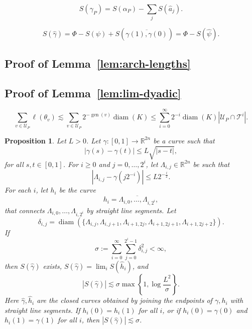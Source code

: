 \documentclass[10pt,a4paper]{amsart}
\newtheorem{prop}{Proposition}
\newcommand{\R}{\mathbb{R}}
\newcommand{\cT}{\mathcal{T}}
\newcommand{\cU}{\mathcal{U}}
\DeclareMathOperator{\diam}{diam}
\newcommand{\from}{\colon}
\DeclareMathOperator{\gen}{gen}
\begin{document}
  \begin{equation}\label{eq:vca-pf-s-gamma}
    S(\gamma_P) = S(\alpha_P) - \sum_j S(\hat{a}_j).
  \end{equation}

  \begin{equation}\label{eq:s-gamma-s-psi}
    S(\hat{\gamma}) = \Phi - S(\psi) + S(\overline{\gamma(1),\gamma(0)}) = \Phi - S(\hat{\psi}).
  \end{equation}

\subsection{Proof of Lemma~\ref{lem:arch-lengths}}\label{sec:proof-arch-lengths}

\subsection{Proof of Lemma~\ref{lem:lim-dyadic}}\label{sec:proof-dyadic}

  \begin{equation}\label{eq:area-phi-P-sum}
    \sum_{v\in \cU_P} \ell(\theta_v) \lesssim \sum_{v\in \cU_P} 2^{-\gen(v)} \diam(K) \le \sum_{i=0}^\infty 2^{-i} \diam(K) |\cU_P\cap \cT^i|.
  \end{equation}

\begin{prop}\label{prop:rn-curve-area}
  Let $L>0$. Let $\gamma\from [0,1] \to \R^{2n}$ be a curve such that
  \begin{equation}\label{eq:rn-gamma-holder}
    |\gamma(s) - \gamma(t)| \le L \sqrt{|s-t|},
  \end{equation}
  for all $s,t\in [0,1]$. For $i\ge 0$ and $j=0,\dots, 2^i$, let $\Lambda_{i,j} \in \R^{2n}$ be such that
  \begin{equation}\label{eqn:Lambdaij}
  |\Lambda_{i,j} - \gamma(j2^{-i})| \leq L 2^{-\frac{i}{2}}.
  \end{equation}
  For each $i$, let $h_i$ be the curve
  \begin{equation}\label{eqn:girn}
  h_i =\overline{\Lambda_{i,0},\dots, \Lambda_{i,2^i}},
  \end{equation}
  that connects $\Lambda_{i,0},\dots, \Lambda_{i,2^i}$ by straight line segments. Let
  $$\delta_{i,j} = \diam(\{\Lambda_{i,j}, \Lambda_{i,j+1}, \Lambda_{i+1,2j}, \Lambda_{i+1,2j+1}, \Lambda_{i+1,2j+2}\}).$$
  If
  \begin{equation}\label{eqn:ConditionSigmaRn}
  \sigma := \sum_{i=0}^\infty \sum_{j=0}^{2^i-1} \delta_{i,j}^2 < \infty,
  \end{equation}
  then $S(\hat{\gamma})$ exists, $S(\hat{\gamma}) = \lim_iS(\hat{h}_i)$, and 
  \begin{equation}\label{eq:sgi-bound-rn}
    |S(\hat{\gamma})| \lesssim \sigma \max\left\{1, \log \frac{L^2}{\sigma}\right\}.
  \end{equation}
  Here $\hat\gamma,\hat h_i$ are the closed curves obtained by joining the endpoints of $\gamma,h_i$ with straight line segments. If $h_i(0)=h_i(1)$ for all $i$, or if $h_i(0) = \gamma(0)$ and $h_i(1) = \gamma(1)$ for all $i$, then 
  $|S(\hat{\gamma})| \lesssim \sigma$.
\end{prop}
\end{document}
